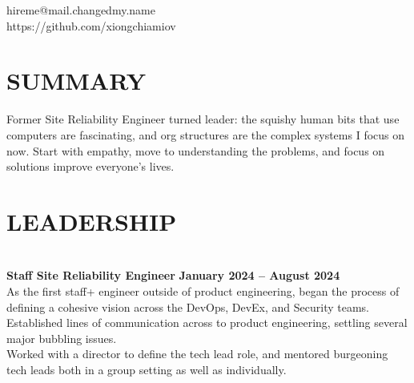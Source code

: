 \documentclass[margin,line]{resume}
\begin{document}
{
    \hfill hireme@mail.changedmy.name       \vspace{0mm}\\\vspace{0mm}%
    \hfill https://github.com/xiongchiamiov \vspace{0mm}\\\vspace{-9mm}%
}

\begin{resume}

    \vspace{-3mm}
    \section{\mysidestyle \textbf{\large{S}\small{UMMARY}}}

    Former Site Reliability Engineer turned leader: the squishy human bits that
    use computers are fascinating, and org structures are the complex systems I
    focus on now.  Start with empathy, move to understanding the problems, and
    focus on solutions improve everyone's lives.

    \vspace{-1mm}

\sectionline
    \section{\mysidestyle \textbf{\large{L}\small{EADERSHIP}}}

    \vspace{1mm}\\%
    \textbf{Staff Site Reliability Engineer} \hfill \textbf{January 2024 -- August 2024}\\
    As the first staff+ engineer outside of product engineering, began the
    process of defining a cohesive vision across the DevOps, DevEx, and
    Security teams.\\
    Established lines of communication across to product engineering, settling
    several major bubbling issues.\\
    Worked with a director to define the tech lead role, and mentored
    burgeoning tech leads both in a group setting as well as individually.


\end{resume}
\end{document}
